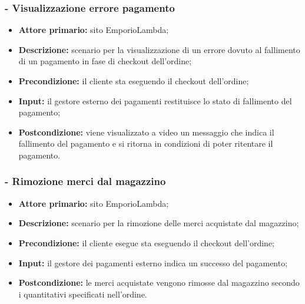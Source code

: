 \subsubsection{ - Visualizzazione errore pagamento}
\begin{itemize}
    \item \textbf{Attore primario:} sito EmporioLambda;
    \item \textbf{Descrizione:} scenario per la visualizzazione di un errore dovuto al fallimento di un pagamento in fase di checkout dell'ordine;
    \item \textbf{Precondizione:} il cliente sta eseguendo il checkout dell'ordine;
    \item \textbf{Input:} il gestore esterno dei pagamenti restituisce lo stato di fallimento del pagamento;
    \item \textbf{Postcondizione:} viene visualizzato a video un messaggio che indica il fallimento del pagamento e si ritorna in condizioni di poter ritentare il pagamento.
\end{itemize}

\stepsubUserCase
\subsubsection{ - Rimozione merci dal magazzino}
\begin{itemize}
    \item \textbf{Attore primario:} sito EmporioLambda;
    \item \textbf{Descrizione:} scenario per la rimozione delle merci acquistate dal magazzino;
    \item \textbf{Precondizione:} il cliente esegue sta eseguendo il checkout dell'ordine;
    \item \textbf{Input:} il gestore dei pagamenti esterno indica un successo del pagamento;
    \item \textbf{Postcondizione:} le merci acquistate vengono rimosse dal magazzino secondo i quantitativi specificati nell'ordine.
\end{itemize}

\stepUserCase
